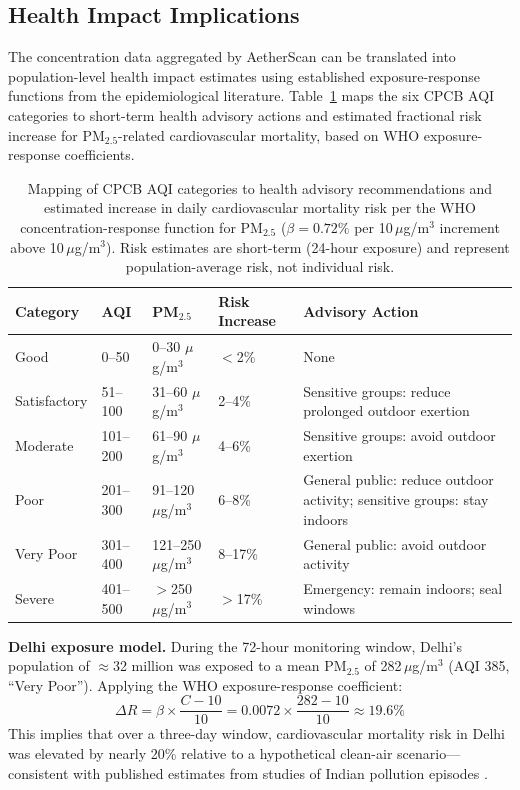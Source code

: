 \documentclass[12pt,a4paper]{article}
\begin{document}
\subsection{Health Impact Implications}
\label{sec:discussion:health}

The concentration data aggregated by AetherScan can be translated into
population-level health impact estimates using established exposure-response
functions from the epidemiological literature. Table~\ref{tab:healthrisk}
maps the six CPCB AQI categories to short-term health advisory actions
and estimated fractional risk increase for PM$_{2.5}$-related cardiovascular
mortality, based on WHO exposure-response coefficients.

\begin{table}[H]
\centering
\caption[AQI categories and corresponding health risk assessment]{%
Mapping of CPCB AQI categories to health advisory recommendations and
estimated increase in daily cardiovascular mortality risk per the
WHO concentration-response function for PM$_{2.5}$
($\beta = 0.72\%$ per 10\,$\mu$g/m$^3$ increment above 10\,$\mu$g/m$^3$).
Risk estimates are short-term (24-hour exposure) and represent
population-average risk, not individual risk.}
\label{tab:healthrisk}
\begin{tabularx}{\textwidth}{@{}lXXXX@{}}
\toprule
\textbf{Category} & \textbf{AQI} & \textbf{PM$_{2.5}$} &
\textbf{Risk Increase} & \textbf{Advisory Action} \\
\midrule
Good         & 0--50   & 0--30 $\mu$g/m$^3$   & $<$2\%  & None \\
Satisfactory & 51--100 & 31--60 $\mu$g/m$^3$  & 2--4\%  & Sensitive groups: reduce prolonged outdoor exertion \\
Moderate     & 101--200 & 61--90 $\mu$g/m$^3$ & 4--6\%  & Sensitive groups: avoid outdoor exertion \\
Poor         & 201--300 & 91--120 $\mu$g/m$^3$ & 6--8\%  & General public: reduce outdoor activity; sensitive groups: stay indoors \\
Very Poor    & 301--400 & 121--250 $\mu$g/m$^3$ & 8--17\% & General public: avoid outdoor activity \\
Severe       & 401--500 & $>$250 $\mu$g/m$^3$  & $>$17\% & Emergency: remain indoors; seal windows \\
\bottomrule
\end{tabularx}
\end{table}

\noindent\textbf{Delhi exposure model.}
During the 72-hour monitoring window, Delhi's population of
$\approx$32 million was exposed to a mean PM$_{2.5}$ of
282\,$\mu$g/m$^3$ (AQI 385, ``Very Poor''). Applying the WHO
exposure-response coefficient:
\[
\Delta R = \beta \times \frac{C - 10}{10}
         = 0.0072 \times \frac{282 - 10}{10}
         \approx 19.6\%
\]
This implies that over a three-day window, cardiovascular mortality
risk in Delhi was elevated by nearly 20\% relative to a hypothetical
clean-air scenario---consistent with published estimates
from studies of Indian pollution episodes \cite{who2021}.
\end{document}

